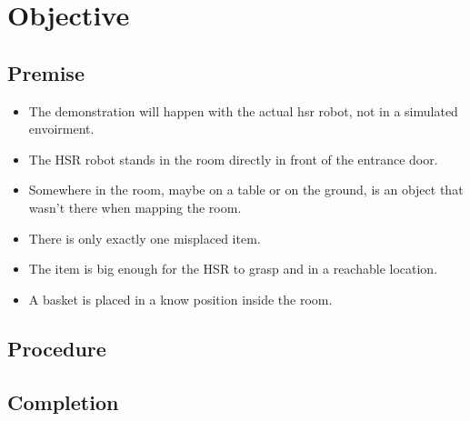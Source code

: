 \documentclass[main.tex]{subfiles}
\begin{document}
	
	\chapter{Objective}
	\section{Premise}
		\begin{itemize}
			\item The demonstration will happen with the actual hsr robot, not in a simulated envoirment.
			\item The HSR robot stands in the room directly in front of the entrance door.
			\item Somewhere in the room, maybe on a table or on the ground, is an object that wasn't there when mapping the room.
			\item There is only exactly one misplaced item.
			\item The item is big enough for the HSR to grasp and in a reachable location.
			\item A basket is placed in a know position inside the room.
			\end{itemize} 
		
	\section{Procedure}
	
	\section{Completion}
\end{document}
